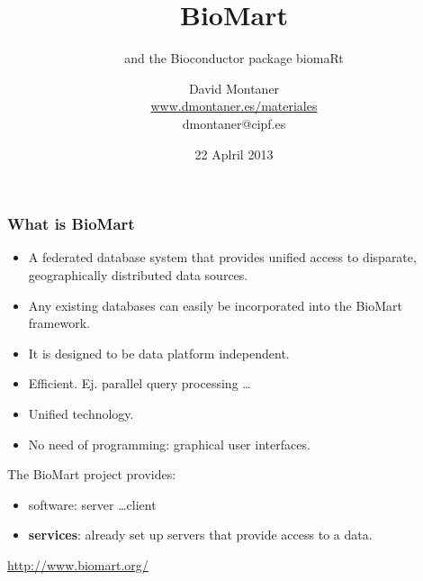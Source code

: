 \documentclass{beamer}
\title{BioMart}
\date{22 Aplril 2013}
\subtitle{and the Bioconductor package biomaRt}
\author{David Montaner \\ 
  \href{http://www.dmontaner.es/materiales}{www.dmontaner.es/materiales} \\ 
  dmontaner@cipf.es}
\begin{document}
\begin{frame}
  \maketitle
\end{frame}




\begin{frame}[allowframebreaks]
  \frametitle{What is BioMart}
  
  \begin{itemize}
  \item A federated database system that provides unified access to disparate, geographically distributed data sources.
  \item Any existing databases can easily be incorporated into the BioMart framework.
  \item It is designed to be data platform independent.  
  \item Efficient. Ej. parallel query processing \dots
  \item Unified technology.
  \item No need of programming: graphical user interfaces. 
  \end{itemize}  
  
  \framebreak
  
  The BioMart project provides:
  
  \begin{itemize}
  \item software: server \dots client
  \item \textbf{services}: already set up servers that provide access to a data.
  \end{itemize}  

  \bigskip

  \centering
  \url{http://www.biomart.org/}
  
\end{frame}

\end{document}
